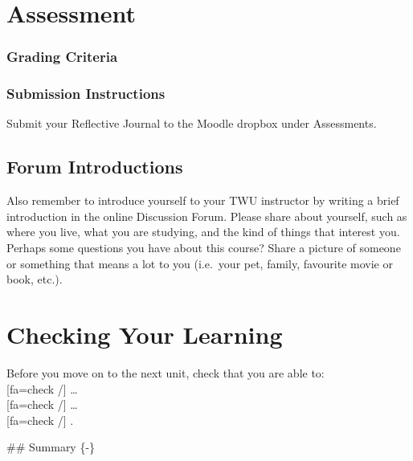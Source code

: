 \documentclass[
]{book}
\begin{document}
\hypertarget{assessment-1}{%
\section*{Assessment}\label{assessment-1}}

\hypertarget{grading-criteria-1}{%
\subsubsection*{Grading Criteria}\label{grading-criteria-1}}

\hypertarget{submission-instructions-1}{%
\subsubsection*{Submission Instructions}\label{submission-instructions-1}}

Submit your Reflective Journal to the Moodle dropbox under Assessments.

\hypertarget{forum-introductions-1}{%
\subsection*{Forum Introductions}\label{forum-introductions-1}}

Also remember to introduce yourself to your TWU instructor by writing a brief introduction in the online Discussion Forum. Please share about yourself, such as where you live, what you are studying, and the kind of things that interest you. Perhaps some questions you have about this course? Share a picture of someone or something that means a lot to you (i.e.~your pet, family, favourite movie or book, etc.).

\hypertarget{checking-your-learning-1}{%
\section*{Checking Your Learning}\label{checking-your-learning-1}}

\begin{progress}
Before you move on to the next unit, check that you are able to:\\
{[}fa=check /{]} \ldots{}\\
{[}fa=check /{]} \ldots{}\\
{[}fa=check /{]} .
\end{progress}
\#\# Summary \{-\}
\end{document}
